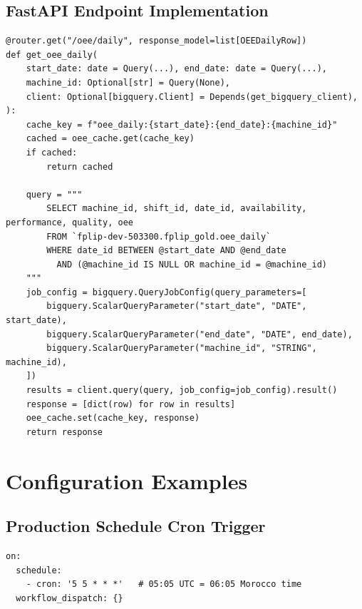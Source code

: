 \documentclass[12pt, a4paper]{report}
\begin{document}
\section{FastAPI Endpoint Implementation}
\begin{lstlisting}[style=pythonstyle, caption={FastAPI Endpoint with In-Memory TTL Cache}, label={lst:fastapi-code}]
@router.get("/oee/daily", response_model=list[OEEDailyRow])
def get_oee_daily(
    start_date: date = Query(...), end_date: date = Query(...),
    machine_id: Optional[str] = Query(None),
    client: Optional[bigquery.Client] = Depends(get_bigquery_client),
):
    cache_key = f"oee_daily:{start_date}:{end_date}:{machine_id}"
    cached = oee_cache.get(cache_key)
    if cached:
        return cached

    query = """
        SELECT machine_id, shift_id, date_id, availability, performance, quality, oee
        FROM `fplip-dev-503300.fplip_gold.oee_daily`
        WHERE date_id BETWEEN @start_date AND @end_date
          AND (@machine_id IS NULL OR machine_id = @machine_id)
    """
    job_config = bigquery.QueryJobConfig(query_parameters=[
        bigquery.ScalarQueryParameter("start_date", "DATE", start_date),
        bigquery.ScalarQueryParameter("end_date", "DATE", end_date),
        bigquery.ScalarQueryParameter("machine_id", "STRING", machine_id),
    ])
    results = client.query(query, job_config=job_config).result()
    response = [dict(row) for row in results]
    oee_cache.set(cache_key, response)
    return response
\end{lstlisting}

\chapter{Configuration Examples}
\label{app:config}

\section{Production Schedule Cron Trigger}
\begin{lstlisting}[style=yamlstyle, caption={GitHub Actions Daily Production Trigger}, label={lst:cron}]
on:
  schedule:
    - cron: '5 5 * * *'   # 05:05 UTC = 06:05 Morocco time
  workflow_dispatch: {}
\end{lstlisting}
\end{document}
